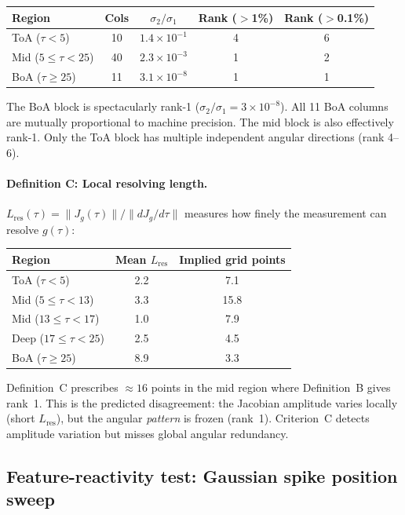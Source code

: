 \documentclass[11pt]{article}
\newcommand{\norm}[1]{\lVert #1 \rVert}
\begin{document}
\begin{center}
\begin{tabular}{l c c c c}
\toprule
Region & Cols & $\sigma_2/\sigma_1$ & Rank ($>$1\%) & Rank ($>$0.1\%)\\
\midrule
ToA ($\tau<5$)       & 10 & $1.4\times10^{-1}$ & 4 & 6\\
Mid ($5\!\leq\!\tau\!<\!25$)  & 40 & $2.3\times10^{-3}$ & 1 & 2\\
BoA ($\tau\geq 25$)  & 11 & $3.1\times10^{-8}$ & 1 & 1\\
\bottomrule
\end{tabular}
\end{center}

The BoA block is spectacularly rank-1 ($\sigma_2/\sigma_1 =
3\times10^{-8}$).  All 11 BoA columns are mutually proportional
to machine precision.  The mid block is also effectively rank-1.
Only the ToA block has multiple independent angular directions
(rank 4--6).

\paragraph{Definition C: Local resolving length.}
$L_\mathrm{res}(\tau) = \norm{J_g(\tau)} / \norm{dJ_g/d\tau}$
measures how finely the measurement can resolve $g(\tau)$:

\begin{center}
\begin{tabular}{l c c}
\toprule
Region & Mean $L_\mathrm{res}$ & Implied grid points\\
\midrule
ToA ($\tau<5$)       & 2.2  & 7.1\\
Mid ($5\!\leq\!\tau\!<\!13$)  & 3.3  & 15.8\\
Mid ($13\!\leq\!\tau\!<\!17$) & 1.0  & 7.9\\
Deep ($17\!\leq\!\tau\!<\!25$) & 2.5  & 4.5\\
BoA ($\tau\geq 25$)  & 8.9  & 3.3\\
\bottomrule
\end{tabular}
\end{center}

Definition~C prescribes ${\approx}16$ points in the mid
region where Definition~B gives rank~1.  This is the predicted
disagreement: the Jacobian amplitude varies locally
(short $L_\mathrm{res}$), but the angular \emph{pattern}
is frozen (rank~1).  Criterion~C detects amplitude variation
but misses global angular redundancy.

\subsection{Feature-reactivity test: Gaussian spike position sweep}
\end{document}
